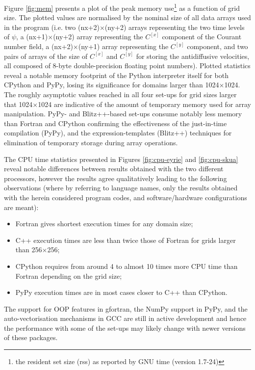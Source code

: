 \documentclass[final,5p,times,twocolumn]{elsarticle}
\begin{document}
  Figure \ref{fig:mem} presents a plot of the peak memory use\footnote{the resident set size (rss)
    as reported by GNU time (version 1.7-24)} as a function of grid size.
  The plotted values are normalised by the nominal size of all data arrays used in the program
    (i.e. two (nx+2)$\times$(ny+2) arrays representing the two time levels of $\psi$, 
     a (nx+1)$\times$(ny+2) array representing the $C^{[x]}$ component of the Courant number field,
     a (nx+2)$\times$(ny+1) array representing the $C^{[y]}$ component, 
     and two pairs of arrays of the size of $C^{[x]}$ and $C^{[y]}$ for storing the 
     antidiffusive velocities, all composed of 8-byte double-precision floating point numbers).
  Plotted statistics reveal a notable memory footprint of the Python interpreter itself
    for both CPython and PyPy, losing its significance for domains larger than 1024$\times$1024.
  The roughly asymptotic values reached in all four set-ups for grid sizes larger that 1024$\times$1024
    are indicative of the amount of temporary memory used for array manipulation.
  PyPy- and Blitz++-based set-ups consume notably less memory than Fortran and CPython confirming 
    the effectiveness of the just-in-time compilation (PyPy), and the expression-templates (Blitz++) techniques
    for elimination of temporary storage during array operations.

  The CPU time statistics presented in Figures \ref{fig:cpu-eyrie} and \ref{fig:cpu-skua} reveal
    notable differences between results obtained with the two different processors,
    however the results agree qualitatively leading to the following observations
    (where by referring to language names, only the results obtained with the herein considered
     program codes, and software/hardware configurations are meant):
  \begin{itemize}
    \item{Fortran gives shortest execution times for any domain size;}
    \item{C++ execution times are less than twice those of Fortran for grids larger than 
      256$\times$256;}
    \item{CPython requires from around 4 to almost 10 times more CPU time than Fortran depending on the grid size;}
    \item{PyPy execution times are in most cases closer to C++ than CPython.}
  \end{itemize}
  The support for OOP features in gfortran, the NumPy support in PyPy, and the auto-vectorisation
    mechanisms in GCC are still in active development and hence the performance with some of the set-ups may 
    likely change with newer versions of these packages. 
\end{document}
